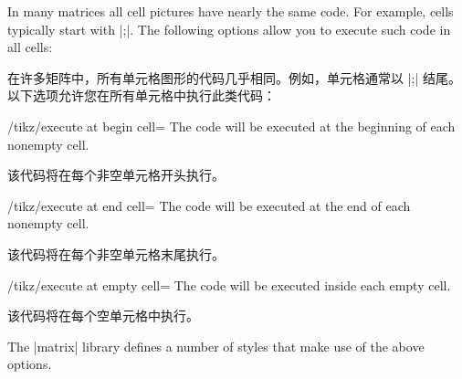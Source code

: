 In many matrices all cell pictures have nearly the same code. For example,
cells typically start with |;|. The following options allow
you to execute such code in all cells:

在许多矩阵中，所有单元格图形的代码几乎相同。例如，单元格通常以 |;| 结尾。以下选项允许您在所有单元格中执行此类代码：

\begin{key}{/tikz/execute at begin cell=}
    The code will be executed at the beginning of each nonempty cell.

    该代码将在每个非空单元格开头执行。

  \end{key}
%
\begin{key}{/tikz/execute at end cell=}
    The code will be executed at the end of each nonempty cell.

    该代码将在每个非空单元格末尾执行。

  \end{key}
%
\begin{key}{/tikz/execute at empty cell=}
    The code will be executed inside each empty cell.

    该代码将在每个空单元格中执行。

  \end{key}
%
\begin{codeexample}[]
\end{codeexample}
%
\begin{codeexample}[]
\end{codeexample}

The |matrix| library defines a number of styles that make use of the above
options.

